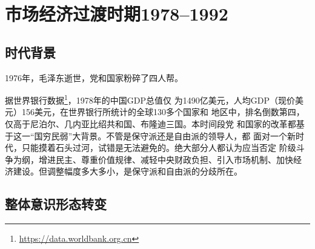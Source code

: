 \chapter{市场经济过渡时期1978--1992}
\label{chap:1978}

\section{时代背景}

1976年，毛泽东逝世，党和国家粉碎了四人帮。

据世界银行数据\footnote{\url{https://data.worldbank.org.cn}}，1978年的中国GDP总值仅
为1490亿美元，人均GDP（现价美元）156美元，在世界银行所统计的全球130多个国家和
地区中，排名倒数第四，仅高于尼泊尔、几内亚比绍共和国、布隆迪三国。本时间段党
和国家的改革都基于这一“国穷民弱”大背景。不管是保守派还是自由派的领导人，都
面对一个新时代，只能摸着石头过河，试错是无法避免的。绝大部分人都认为应当否定
阶级斗争为纲，增进民主、尊重价值规律、减轻中央财政负担、引入市场机制、加快经
济建设。但调整幅度多大多小，是保守派和自由派的分歧所在。

\section{整体意识形态转变}

